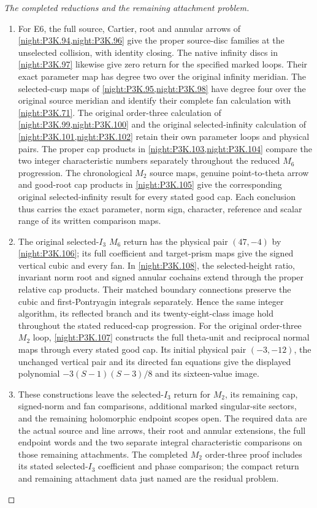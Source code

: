 \begin{proof}[The completed reductions and the remaining attachment problem]
\begin{enumerate}[label=\arabic*.]
\item For E6, the full source, Cartier, root and annular arrows of
\cref{night:P3K.94,night:P3K.96} give the proper source-disc families
at the unselected collision, with identity closing. The native
infinity discs in \cref{night:P3K.97} likewise give zero return for
the specified marked loops. Their exact parameter map has degree
two over the original infinity meridian. The selected-cusp maps of
\cref{night:P3K.95,night:P3K.98} have degree four over the original
source meridian and identify their complete fan calculation with
\cref{night:P3K.71}. The original order-three calculation of
\cref{night:P3K.99,night:P3K.100} and the original selected-infinity
calculation of \cref{night:P3K.101,night:P3K.102} retain their own
parameter loops and physical pairs. The proper cap products in
\cref{night:P3K.103,night:P3K.104} compare the two integer
characteristic numbers separately throughout the reduced \(M_6\)
progression. The chronological \(M_2\) source maps, genuine
point-to-theta arrow and good-root cap products in
\cref{night:P3K.105} give the corresponding original selected-infinity
result for every stated good cap. Each conclusion thus carries the
exact parameter, norm sign, character, reference and scalar range
of its written comparison maps.

\item The original selected-\(I_3\) \(M_6\) return has the physical
pair \((47,-4)\) by \cref{night:P3K.106}; its full coefficient
and target-prism maps give the signed vertical cubic and every fan.
In \cref{night:P3K.108}, the selected-height ratio, invariant norm
root and signed annular cochains extend through the proper relative
cap products. Their matched boundary connections preserve the cubic
and first-Pontryagin integrals separately. Hence the same integer
algorithm, its reflected branch and its twenty-eight-class image
hold throughout the stated reduced-cap progression. For the original
order-three \(M_2\) loop, \cref{night:P3K.107} constructs the full
theta-unit and reciprocal normal maps through every stated good
cap. Its initial physical pair \((-3,-12)\), the unchanged vertical
pair and its directed fan equations give the displayed polynomial
\(-3(S-1)(S-3)/8\) and its sixteen-value image.

\item These constructions leave the selected-\(I_3\) return for
\(M_2\), its remaining cap, signed-norm and fan comparisons,
additional marked singular-site sectors, and the remaining
holomorphic endpoint scopes open. The required data are the actual
source and line arrows, their root and annular extensions, the full
endpoint words and the two separate integral characteristic
comparisons on those remaining attachments. The completed
\(M_2\) order-three proof includes its stated selected-\(I_3\)
coefficient and phase comparison; the compact return and remaining
attachment data just named are the residual problem.
\end{enumerate}
\end{proof}
